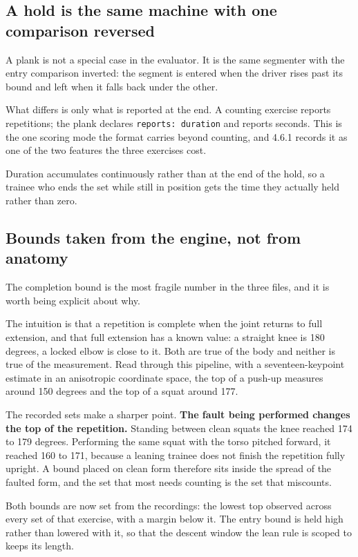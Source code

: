 \subsection{A hold is the same machine with one comparison reversed}
\label{sec:6.3.1}

A plank is not a special case in the evaluator. It is the same segmenter with the entry comparison inverted: the segment is entered when the driver rises past its bound and left when it falls back under the other.

What differs is only what is reported at the end. A counting exercise reports repetitions; the plank declares \texttt{reports:\allowbreak{} duration} and reports seconds. This is the one scoring mode the format carries beyond counting, and 4.6.1 records it as one of the two features the three exercises cost.

Duration accumulates continuously rather than at the end of the hold, so a trainee who ends the set while still in position gets the time they actually held rather than zero.

\subsection{Bounds taken from the engine, not from anatomy}
\label{sec:6.3.2}

The completion bound is the most fragile number in the three files, and it is worth being explicit about why.

The intuition is that a repetition is complete when the joint returns to full extension, and that full extension has a known value: a straight knee is 180 degrees, a locked elbow is close to it. Both are true of the body and neither is true of the measurement. Read through this pipeline, with a seventeen-keypoint estimate in an anisotropic coordinate space, the top of a push-up measures around 150 degrees and the top of a squat around 177.

The recorded sets make a sharper point. \textbf{The fault being performed changes the top of the repetition.} Standing between clean squats the knee reached 174 to 179 degrees. Performing the same squat with the torso pitched forward, it reached 160 to 171, because a leaning trainee does not finish the repetition fully upright. A bound placed on clean form therefore sits inside the spread of the faulted form, and the set that most needs counting is the set that miscounts.

Both bounds are now set from the recordings: the lowest top observed across every set of that exercise, with a margin below it. The entry bound is held high rather than lowered with it, so that the descent window the lean rule is scoped to keeps its length.

